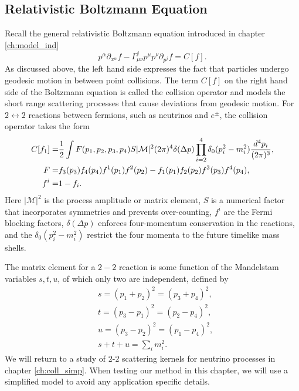 \subsection{Relativistic Boltzmann Equation }\label{boltzmann_basics}

Recall the general relativistic Boltzmann equation introduced in chapter \ref{ch:model_ind}
\begin{equation}\label{boltzmann}
p^\alpha\partial_{x^\alpha}f-\Gamma^j_{\mu\nu}p^\mu p^\nu\partial_{p^j}f=C[f].
\end{equation}
As discussed above, the left hand side expresses the fact that particles undergo geodesic motion in between point collisions. The term $C[f]$ on the right hand side of the Boltzmann equation is called the collision operator and models the short range scattering processes that cause deviations from geodesic motion. For $2\leftrightarrow 2$ reactions between fermions, such as neutrinos and $e^\pm$, the collision operator takes the form
\begin{align}\label{coll}
C[f_1]=&\frac{1}{2}\int F(p_1,p_2,p_3,p_4) S |\mathcal{M}|^2(2\pi)^4\delta(\Delta p)\prod_{i=2}^4\delta_0(p_i^2-m_i^2)\frac{d^4p_i}{(2\pi)^3},\\
F=&f_3(p_3)f_4(p_4)f^1(p_1)f^2(p_2)-f_1(p_1)f_2(p_2)f^3(p_3)f^4(p_4),\notag\\
f^i=&1- f_i.\notag
\end{align}
Here $|\mathcal{M}|^2$ is the process amplitude or matrix element, $S$ is a numerical factor that incorporates symmetries and prevents over-counting, $f^i$ are the Fermi blocking factors, $\delta(\Delta p)$ enforces four-momentum conservation in the reactions, and the $\delta_0(p_i^2-m_i^2)$ restrict the four momenta to the future timelike mass shells.


The matrix element for a $2-2$ reaction is some function of the Mandelstam variables $s, t, u$, of which only two are independent, defined by 
\begin{align}\label{Mandelstam}
&s=(p_1+p_2)^2=(p_3+p_4)^2,\\
&t=(p_3-p_1)^2=(p_2-p_4)^2,\\
&u=(p_3-p_2)^2=(p_1-p_4)^2,\\
&s+t+u=\sum_i m_i^2.
\end{align}
We will return to a study of $2$-$2$ scattering kernels for neutrino processes in chapter \ref{ch:coll_simp}.  When testing our method in this chapter, we will use a simplified model to avoid any application specific details.

